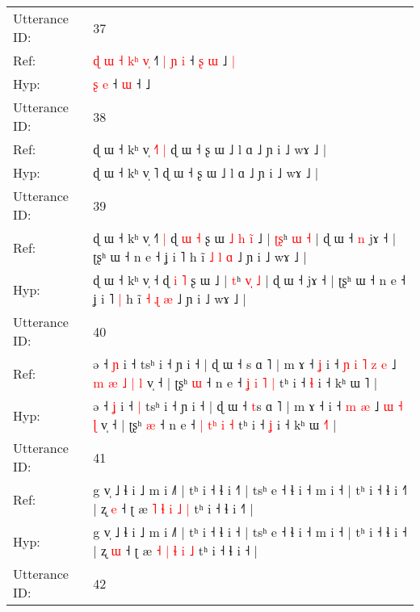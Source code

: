 \documentclass[10pt]{article}
\DeclareRobustCommand{\hl}[1]{{\textcolor{red}{#1}}}
\begin{document}
\begin{longtable}{ll}
\midrule
Utterance ID: & 37 \\
Ref: & \hl{ɖ}\hl{ }\hl{ɯ}\hl{ }\hl{˧}\hl{ }\hl{k}\hl{ʰ} \hl{v}\hl{̩} ˧\hl{˥}\hl{ }\hl{|}\hl{ }\hl{ɲ} \hl{i} ˧\hl{ }\hl{ʂ}\hl{ }\hl{ɯ} ˩\hl{ }\hl{|}
 \\
Hyp: & \hl{}\hl{}\hl{}\hl{}\hl{}\hl{}\hl{}\hl{ʂ} \hl{}\hl{e} ˧\hl{}\hl{}\hl{}\hl{}\hl{} \hl{ɯ} ˧\hl{}\hl{}\hl{}\hl{} ˩\hl{}\hl{}
 \\
\midrule
Utterance ID: & 38 \\
Ref: & ɖ ɯ ˧ kʰ v̩ \hl{˧}˥\hl{ }\hl{|} ɖ ɯ ˧ ʂ ɯ ˩ l ɑ ˩ ɲ i ˩ wɤ ˩ |
 \\
Hyp: & ɖ ɯ ˧ kʰ v̩ \hl{}˥\hl{}\hl{} ɖ ɯ ˧ ʂ ɯ ˩ l ɑ ˩ ɲ i ˩ wɤ ˩ |
 \\
\midrule
Utterance ID: & 39 \\
Ref: & ɖ ɯ ˧ kʰ v̩ ˧\hl{˥}\hl{ }\hl{|} ɖ \hl{ɯ} \hl{˧} ʂ ɯ\hl{ }\hl{˩}\hl{ }\hl{h}\hl{ }\hl{i}\hl{̃} ˩ | \hl{ʈ}\hl{ʂ}ʰ \hl{}\hl{ɯ} \hl{˧} | ɖ ɯ ˧\hl{ }\hl{n} jɤ ˧ | ʈʂʰ ɯ ˧ n e ˧ ʝ i ˥\hl{}\hl{} h ĩ \hl{˩} \hl{l} \hl{ɑ} ˩ ɲ i ˩ wɤ ˩ |
 \\
Hyp: & ɖ ɯ ˧ kʰ v̩ ˧\hl{}\hl{}\hl{} ɖ \hl{i} \hl{˥} ʂ ɯ\hl{}\hl{}\hl{}\hl{}\hl{}\hl{}\hl{} ˩ | \hl{}\hl{t}ʰ \hl{v}\hl{̩} \hl{˩} | ɖ ɯ ˧\hl{}\hl{} jɤ ˧ | ʈʂʰ ɯ ˧ n e ˧ ʝ i ˥\hl{ }\hl{|} h ĩ \hl{˧} \hl{ɻ} \hl{æ} ˩ ɲ i ˩ wɤ ˩ |
 \\
\midrule
Utterance ID: & 40 \\
Ref: & ə ˧ \hl{ɲ} i ˧\hl{}\hl{} tsʰ i ˧ ɲ i ˧ | ɖ ɯ ˧ \hl{}s ɑ ˥ | m ɤ ˧\hl{ }\hl{ʝ} i ˧\hl{ }\hl{ɲ}\hl{ }\hl{i}\hl{ }\hl{˥} \hl{z} \hl{e} ˩\hl{ }\hl{m}\hl{ }\hl{æ} \hl{˩} \hl{|} \hl{l} v̩ ˧ | ʈʂʰ \hl{ɯ} ˧ n e ˧ \hl{ʝ} \hl{}\hl{i} \hl{˥} \hl{|} tʰ i ˧ \hl{ɬ} i ˧ kʰ ɯ \hl{}˥ |
 \\
Hyp: & ə ˧ \hl{ʝ} i ˧\hl{ }\hl{|} tsʰ i ˧ ɲ i ˧ | ɖ ɯ ˧ \hl{t}s ɑ ˥ | m ɤ ˧\hl{}\hl{} i ˧\hl{}\hl{}\hl{}\hl{}\hl{}\hl{} \hl{m} \hl{æ} ˩\hl{}\hl{}\hl{}\hl{} \hl{ɯ} \hl{˧} \hl{ɭ} v̩ ˧ | ʈʂʰ \hl{æ} ˧ n e ˧ \hl{|} \hl{t}\hl{ʰ} \hl{i} \hl{˧} tʰ i ˧ \hl{ʝ} i ˧ kʰ ɯ \hl{˧}˥ |
 \\
\midrule
Utterance ID: & 41 \\
Ref: & g v̩ ˩ ɬ i ˩ m i ˩˥ | tʰ i ˧ ɬ i ˧\hl{˥} | tsʰ e ˧ ɬ i ˧ m i ˧ | tʰ i ˧ ɬ i ˧\hl{˥} | ʐ \hl{e} ˧ ʈ æ \hl{˥} \hl{ɬ} \hl{i} \hl{˩} \hl{|} tʰ i ˧ ɬ i ˧\hl{˥} |
 \\
Hyp: & g v̩ ˩ ɬ i ˩ m i ˩˥ | tʰ i ˧ ɬ i ˧\hl{} | tsʰ e ˧ ɬ i ˧ m i ˧ | tʰ i ˧ ɬ i ˧\hl{} | ʐ \hl{ɯ} ˧ ʈ æ \hl{˧} \hl{|} \hl{ɬ} \hl{i} \hl{˩} tʰ i ˧ ɬ i ˧\hl{} |
 \\
\midrule
Utterance ID: & 42 \\

\end{longtable}
\end{document}
